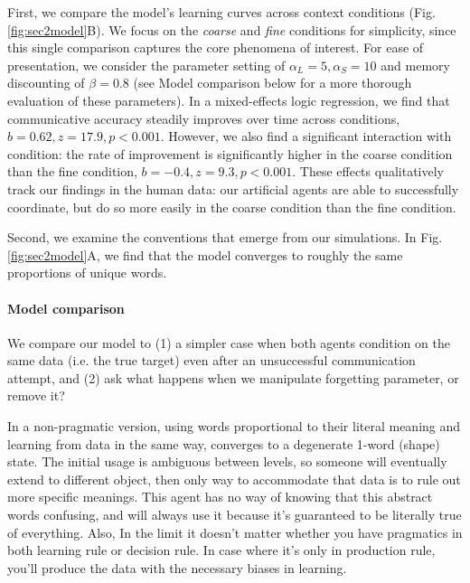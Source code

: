 First, we compare the model's learning curves across context conditions (Fig. \ref{fig:sec2model}B). 
We focus on the \emph{coarse} and \emph{fine} conditions for simplicity, since this single comparison captures the core phenomena of interest.
For ease of presentation, we consider the parameter setting of $\alpha_L=5,\alpha_S=10$ and memory discounting of $\beta = 0.8$ (see Model comparison below for a more thorough evaluation of these parameters).
In a mixed-effects logic regression, we find that communicative accuracy steadily improves over time across conditions, $b=0.62, z = 17.9, p<0.001$.
However, we also find a significant interaction with condition: the rate of improvement is significantly higher in the coarse condition than the fine condition, $b=-0.4, z=9.3, p <0.001$. 
These effects qualitatively track our findings in the human data: our artificial agents are able to successfully coordinate, but do so more easily in the coarse condition than the fine condition. 


Second, we examine the conventions that emerge from our simulations. 
In Fig. \ref{fig:sec2model}A, we find that the model converges to roughly the same proportions of unique words.

\paragraph{Model comparison}

We compare our model to (1) a simpler case when both agents condition on the same data (i.e. the true target) even after an unsuccessful communication attempt, and (2) ask what happens when we manipulate forgetting parameter, or remove it?

In a non-pragmatic version, using words proportional to their literal meaning and learning from data in the same way, converges to a degenerate 1-word (shape) state.
The initial usage is ambiguous between levels, so someone will eventually extend to different object, then only way to accommodate that data is to rule out more specific meanings. 
This agent has no way of knowing that this abstract words confusing, and will always use it because it's guaranteed to be literally true of everything.
Also, In the limit it doesn't matter whether you have pragmatics in both learning rule or decision rule. In case where it's only in production rule, you'll produce the data with the necessary biases in learning.

